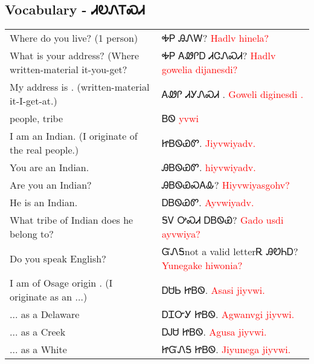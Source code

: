 \begin{multicols}
\newpage\subsection{Vocabulary - ᏗᎧᏁᎢᏍᏗ 
}
\begin{minipage}{\linewidth}
\begin{tabular}{p{5cm} p{9cm}}
Where do you live? (1 person) & ᎭᏢ ᎯᏁᎳ? 
 \newline \textcolor{red}{Hadlv hinela?}\\
What is your address? (Where written-material it-you-get? & ᎭᏢ ᎪᏪᎵᎠ ᏗᏣᏁᏍᏗ? 
 \newline \textcolor{red}{Hadlv gowelia dijanesdi?}\\
My address is \underline{      }. (written-material it-I-get-at.) & ᎪᏪᎵ ᏗᎩᏁᏍᏗ    . 
 \newline \textcolor{red}{Goweli diginesdi    .}\\
people, tribe & ᏴᏫ 
 \newline \textcolor{red}{yvwi}\\
I am an Indian. (I originate of the real people.) & ᏥᏴᏫᏯᏛ. 
 \newline \textcolor{red}{Jiyvwiyadv.}\\
You are an Indian. & ᎯᏴᏫᏯᏛ. 
 \newline \textcolor{red}{hiyvwiyadv.}\\
Are you an Indian? & ᎯᏴᏫᏯᏍᎪᎲ? 
 \newline \textcolor{red}{Hiyvwiyasgohv?}\\
He is an Indian. & ᎠᏴᏫᏯᏛ. 
 \newline \textcolor{red}{Ayvwiyadv.}\\
What tribe of Indian does he belong to? & ᎦᏙ ᎤᏍᏗ ᎠᏴᏫᏯ? 
 \newline \textcolor{red}{Gado usdi ayvwiya?}\\
Do you speak English? & ᏳᏁᎦnot a valid letterᎡ ᎯᏬᏂᎠ? 
 \newline \textcolor{red}{Yunegake hiwonia?}\\
I am of Osage origin . (I originate as an ...) & ᎠᏌᏏ ᏥᏴᏫ. 
 \newline \textcolor{red}{Asasi jiyvwi.}\\
... as a Delaware & ᎠᏆᏅᎩ ᏥᏴᏫ. 
 \newline \textcolor{red}{Agwanvgi jiyvwi.}\\
... as a Creek & ᎠᎫᏌ ᏥᏴᏫ. 
 \newline \textcolor{red}{Agusa jiyvwi.}\\
... as a White & ᏥᏳᏁᎦ ᏥᏴᏫ. 
 \newline \textcolor{red}{Jiyunega jiyvwi.}\\

\end{tabular}
\end{minipage}
\end{multicols}
